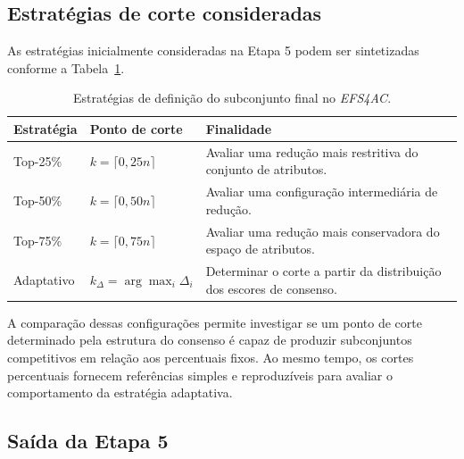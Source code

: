 \subsection{Estratégias de corte consideradas}
\label{subsec:ac-efs-estrategias-corte}

As estratégias inicialmente consideradas na Etapa 5 podem ser sintetizadas
conforme a Tabela~\ref{tab:cortes-ac-efs}.

\begin{table}[ht]
    \centering
    \small
    \caption{Estratégias de definição do subconjunto final no
    \textit{EFS4AC}.}
    \label{tab:cortes-ac-efs}

    \begin{tabular}{p{2.5cm}p{3.3cm}p{6.5cm}}
        \hline
        \textbf{Estratégia}
        & \textbf{Ponto de corte}
        & \textbf{Finalidade} \\
        \hline

        Top-25\%
        & $k=\lceil0{,}25n\rceil$
        & Avaliar uma redução mais restritiva do conjunto de atributos. \\

        Top-50\%
        & $k=\lceil0{,}50n\rceil$
        & Avaliar uma configuração intermediária de redução. \\

        Top-75\%
        & $k=\lceil0{,}75n\rceil$
        & Avaliar uma redução mais conservadora do espaço de atributos. \\

        Adaptativo
        & $k_{\Delta}=\arg\max_i\Delta_i$
        & Determinar o corte a partir da distribuição dos escores de consenso. \\

        \hline
    \end{tabular}
\end{table}

A comparação dessas configurações permite investigar se um ponto de corte
determinado pela estrutura do consenso é capaz de produzir subconjuntos
competitivos em relação aos percentuais fixos. Ao mesmo tempo, os cortes
percentuais fornecem referências simples e reproduzíveis para avaliar o
comportamento da estratégia adaptativa.


\subsection{Saída da Etapa 5}
\label{subsec:ac-efs-saida-etapa5}

